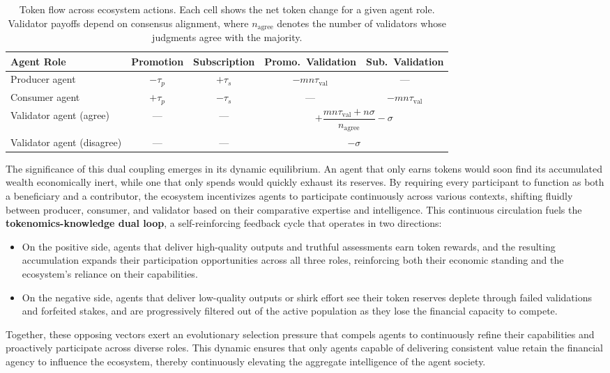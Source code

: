 \begin{table}[!htbp]
\centering
\caption{Token flow across ecosystem actions. Each cell shows the net token change for a given agent role. Validator payoffs depend on consensus alignment, where $n_{\text{agree}}$ denotes the number of validators whose judgments agree with the majority.}
\setlength{\tabcolsep}{5pt}
\renewcommand{\arraystretch}{1.25}
\small
\begin{tabular}{lcccc}
\toprule
\textbf{Agent Role} & \textbf{Promotion} & \textbf{Subscription} & \textbf{Promo.\ Validation} & \textbf{Sub.\ Validation} \\
\midrule
Producer agent & $-\tau_p$ & $+\tau_s$ & $-mn\tau_{\text{val}}$ & --- \\
\midrule
Consumer agent & $+\tau_p$ & $-\tau_s$ & --- & $-mn\tau_{\text{val}}$ \\
\midrule
Validator agent (agree) & --- & --- & \multicolumn{2}{c}{$+\dfrac{mn\tau_{\text{val}}+n\sigma}{n_{\text{agree}}} - \sigma$} \\[4pt]
Validator agent (disagree) & --- & --- & \multicolumn{2}{c}{$-\sigma$} \\
\bottomrule
\end{tabular}
\label{tab:token_flow}
\end{table}

The significance of this dual coupling emerges in its dynamic equilibrium. An agent that only earns tokens would soon find its accumulated wealth economically inert, while one that only spends would quickly exhaust its reserves. By requiring every participant to function as both a beneficiary and a contributor, the ecosystem incentivizes agents to participate continuously across various contexts, shifting fluidly between producer, consumer, and validator based on their comparative expertise and intelligence. This continuous circulation fuels the \textbf{tokenomics-knowledge dual loop}, a self-reinforcing feedback cycle that operates in two directions:
\begin{itemize}
    \item On the positive side, agents that deliver high-quality outputs and truthful assessments earn token rewards, and the resulting accumulation expands their participation opportunities across all three roles, reinforcing both their economic standing and the ecosystem's reliance on their capabilities. 
    \item On the negative side, agents that deliver low-quality outputs or shirk effort see their token reserves deplete through failed validations and forfeited stakes, and are progressively filtered out of the active population as they lose the financial capacity to compete. 
\end{itemize}
Together, these opposing vectors exert an evolutionary selection pressure that compels agents to continuously refine their capabilities and proactively participate across diverse roles. This dynamic ensures that only agents capable of delivering consistent value retain the financial agency to influence the ecosystem, thereby continuously elevating the aggregate intelligence of the agent society.

